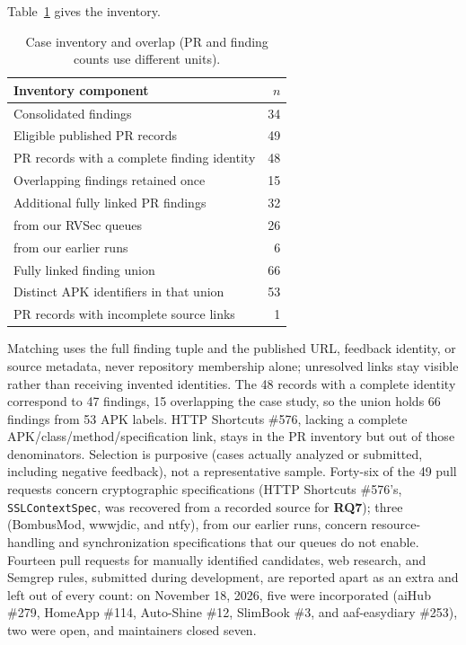 \documentclass[conference]{IEEEtran}
\newcommand{\researchq}[1]{\textbf{RQ#1}}
\begin{document}
Table~\ref{tab:sample} gives the inventory.

\begin{table}[H]
\centering
\caption{Case inventory and overlap (PR and finding counts use different units).}
\label{tab:sample}
\footnotesize
\begin{tabular}{p{6.1cm}r}
\toprule
Inventory component & $n$ \\
\midrule
Consolidated findings & 34 \\
Eligible published PR records & 49 \\
PR records with a complete finding identity & 48 \\
Overlapping findings retained once & 15 \\
Additional fully linked PR findings & 32 \\
\quad from our RVSec queues & 26 \\
\quad from our earlier runs & 6 \\
Fully linked finding union & 66 \\
Distinct APK identifiers in that union & 53 \\
PR records with incomplete source links & 1 \\
\bottomrule
\end{tabular}
\end{table}

Matching uses the full finding tuple and the published URL, feedback identity,
or source metadata, never repository membership alone; unresolved links stay
visible rather than receiving invented identities. The 48 records with a
complete identity correspond to 47 findings, 15 overlapping the case study,
so the union holds 66 findings from 53 APK labels. HTTP Shortcuts \#576,
lacking a complete APK/class/method/specification link, stays in the PR
inventory but out of those denominators. Selection is purposive (cases
actually analyzed or submitted, including negative feedback), not a
representative sample. Forty-six of the 49 pull requests concern
cryptographic specifications (HTTP Shortcuts \#576's, \texttt{SSLContextSpec},
was recovered from a recorded source for \researchq{7}); three (BombusMod,
wwwjdic, and ntfy), from our earlier runs, concern resource-handling and
synchronization specifications that our queues do not enable. Fourteen pull requests for manually
identified candidates, web research, and Semgrep rules, submitted during
development, are reported apart as an extra and left out of every count: on
November 18, 2026, five were incorporated (aiHub \#279, HomeApp \#114,
Auto-Shine \#12, SlimBook \#3, and aaf-easydiary \#253), two were open, and
maintainers closed seven.
\end{document}
